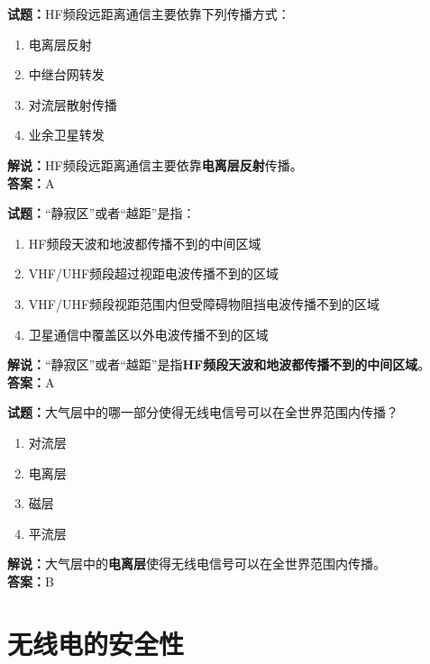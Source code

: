 \documentclass{ctexbook}
\begin{document}
\vspace{1em}

\textbf{试题：}HF频段远距离通信主要依靠下列传播方式：
\begin{enumerate}[leftmargin=3em]
  \item 电离层反射
  \item 中继台网转发
  \item 对流层散射传播
  \item 业余卫星转发
\end{enumerate}
\noindent\textbf{解说：}HF频段远距离通信主要依靠\textbf{电离层反射}传播。\\\noindent\textbf{答案：}A

\vspace{1em}

\textbf{试题：}“静寂区”或者“越距”是指：
\begin{enumerate}[leftmargin=3em]
  \item HF频段天波和地波都传播不到的中间区域
  \item VHF/UHF频段超过视距电波传播不到的区域
  \item VHF/UHF频段视距范围内但受障碍物阻挡电波传播不到的区域
  \item 卫星通信中覆盖区以外电波传播不到的区域
\end{enumerate}
\noindent\textbf{解说：}“静寂区”或者“越距”是指\textbf{HF频段天波和地波都传播不到的中间区域}。\\\noindent\textbf{答案：}A

\vspace{1em}

\textbf{试题：}大气层中的哪一部分使得无线电信号可以在全世界范围内传播？
\begin{enumerate}[leftmargin=3em]
  \item 对流层
  \item 电离层
  \item 磁层
  \item 平流层
\end{enumerate}
\noindent\textbf{解说：}大气层中的\textbf{电离层}使得无线电信号可以在全世界范围内传播。\\\noindent\textbf{答案：}B


\chapter{无线电的安全性}

\newpage
\end{document}

